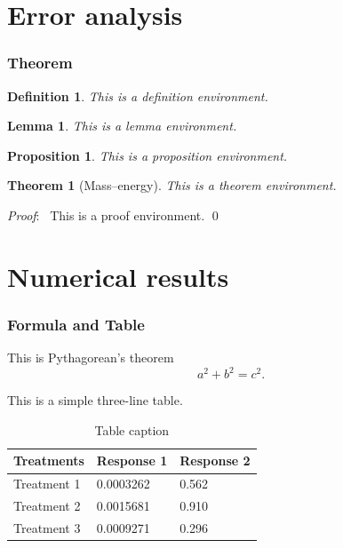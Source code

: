 \documentclass[notheorems,11pt,compress]{beamer}
\newtheorem{theorem}{Theorem}
\numberwithin{theorem}{section}
\newtheorem{definition}{Definition}
\numberwithin{definition}{section}
\newtheorem{lemma}{Lemma}
\numberwithin{lemma}{section}
\newtheorem{proposition}{Proposition}
\numberwithin{proposition}{section}
\numberwithin{corollary}{section}
\theoremstyle{example}
\renewenvironment{proof}[1][Proof]{\textit{#1}:~}{\qed\par}
\numberwithin{figure}{section}
\numberwithin{table}{section}
\numberwithin{equation}{section}
\begin{document}
\section{Error analysis}

\begin{frame}
\frametitle{Theorem}

\begin{definition}
This is a definition environment.
\end{definition}

\begin{lemma}
This is a lemma environment.
\end{lemma}

\begin{proposition}
This is a proposition environment.
\end{proposition}

\begin{theorem}[Mass--energy]
This is a theorem environment.
\end{theorem}

\begin{proof}
  This is a proof environment.
\end{proof}
\end{frame}


\section{Numerical results}  %


\begin{frame}
\frametitle{Formula and Table}

This is Pythagorean's theorem
\begin{equation}\label{Pythagorean}
  a^2+b^2=c^2.
\end{equation}

This is a simple three-line table.
\begin{table}
\caption{Table caption}
\begin{tabular}{l l l}
\toprule
Treatments & Response 1 & Response 2 \\
\midrule
Treatment 1 & 0.0003262 & 0.562 \\
Treatment 2 & 0.0015681 & 0.910 \\
Treatment 3 & 0.0009271 & 0.296 \\
\bottomrule
\end{tabular}
\end{table}

\end{frame}
\end{document}
